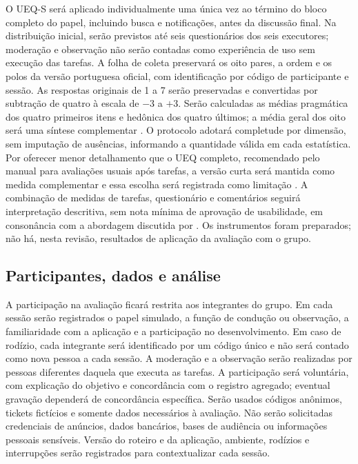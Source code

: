 O UEQ-S será aplicado individualmente uma única vez ao término do bloco completo do papel, incluindo busca e notificações, antes da discussão final. Na distribuição inicial, serão previstos até seis questionários dos seis executores; moderação e observação não serão contadas como experiência de uso sem execução das tarefas. A folha de coleta preservará os oito pares, a ordem e os polos da versão portuguesa oficial, com identificação por código de participante e sessão. As respostas originais de 1 a 7 serão preservadas e convertidas por subtração de quatro à escala de $-3$ a $+3$. Serão calculadas as médias pragmática dos quatro primeiros itens e hedônica dos quatro últimos; a média geral dos oito será uma síntese complementar \cite{schrepp2017}. O protocolo adotará completude por dimensão, sem imputação de ausências, informando a quantidade válida em cada estatística. Por oferecer menor detalhamento que o UEQ completo, recomendado pelo manual para avaliações usuais após tarefas, a versão curta será mantida como medida complementar e essa escolha será registrada como limitação \cite{schrepp2023handbook}. A combinação de medidas de tarefas, questionário e comentários seguirá interpretação descritiva, sem nota mínima de aprovação de usabilidade, em consonância com a abordagem discutida por . Os instrumentos foram preparados; não há, nesta revisão, resultados de aplicação da avaliação com o grupo.

\subsection{\esp Participantes, dados e análise}

A participação na avaliação ficará restrita aos integrantes do grupo. Em cada sessão serão registrados o papel simulado, a função de condução ou observação, a familiaridade com a aplicação e a participação no desenvolvimento. Em caso de rodízio, cada integrante será identificado por um código único e não será contado como nova pessoa a cada sessão. A moderação e a observação serão realizadas por pessoas diferentes daquela que executa as tarefas. A participação será voluntária, com explicação do objetivo e concordância com o registro agregado; eventual gravação dependerá de concordância específica. Serão usados códigos anônimos, tickets fictícios e somente dados necessários à avaliação. Não serão solicitadas credenciais de anúncios, dados bancários, bases de audiência ou informações pessoais sensíveis. Versão do roteiro e da aplicação, ambiente, rodízios e interrupções serão registrados para contextualizar cada sessão.

